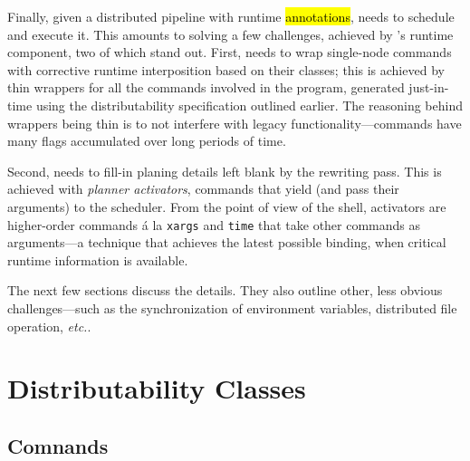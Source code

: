 \documentclass[sigplan,10pt,review,anonymous]{acmart}
\newcommand{\etc}{{\em etc.}\xspace}
\newcommand{\ttt}[1]{\texttt{\small #1}}
\newcommand{\todo}[1]{\hl{#1}\xspace}
\begin{document}
Finally, given a distributed pipeline with runtime \todo{annotations}, \sys needs to schedule and execute it.
This amounts to solving a few challenges, achieved by \sys's runtime component, two of which stand out.
First, \sys needs to wrap single-node commands with corrective runtime interposition based on their classes;
  this is achieved by thin wrappers for all the commands involved in the program, generated just-in-time using the distributability specification outlined earlier.
The reasoning behind wrappers being thin is to not interfere with legacy functionality---commands have many flags accumulated over long periods of time.

Second, \sys needs to fill-in planing details left blank by the rewriting pass.
This is achieved with \emph{planner activators}, commands that yield (and pass their arguments) to the scheduler.
From the point of view of the shell, activators are higher-order commands \'{a} la \ttt{xargs} and \ttt{time} that take other commands as arguments---a technique that achieves the latest possible binding, when critical runtime information is available.

The next few sections discuss the details.
They also outline other, less obvious challenges---such as the synchronization of environment variables, distributed file operation, \etc.


\section{Distributability Classes}

\subsection{Comnands}
\label{bg:cmd}

\end{document}
